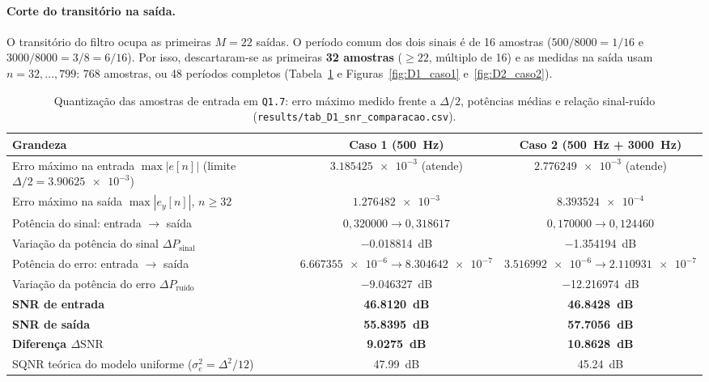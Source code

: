 \documentclass[11pt,a4paper]{article}
\begin{document}
\paragraph{Corte do transitório na saída.} O transitório do filtro ocupa as primeiras $M = 22$ saídas. O período comum dos dois sinais é de 16 amostras ($500/8000 = 1/16$ e $3000/8000 = 3/8 = 6/16$). Por isso, descartaram-se as primeiras \textbf{32 amostras} ($\ge 22$, múltiplo de 16) e as medidas na saída usam $n = 32, \dots, 799$: 768 amostras, ou 48 períodos completos (Tabela~\ref{tab:D1_snr} e Figuras~\ref{fig:D1_caso1} e~\ref{fig:D2_caso2}).

\begin{table}[!htbp]
    \centering
    \caption{Quantização das amostras de entrada em \texttt{Q1.7}: erro máximo medido frente a $\Delta/2$, potências médias e relação sinal-ruído (\texttt{results/\allowbreak tab\_D1\_\allowbreak snr\_comparacao.csv}).}
    \label{tab:D1_snr}
    \small
    \setlength{\tabcolsep}{4.5pt}
    \begin{adjustbox}{max width=\textwidth}
    \begin{tabular}{@{}lcc@{}}
        \toprule
        \textbf{Grandeza} & \textbf{Caso 1 (\SI{500}{Hz})} & \textbf{Caso 2 (\SI{500}{Hz} + \SI{3000}{Hz})} \\
        \midrule
        Erro máximo na entrada $\max|e[n]|$ (limite $\Delta/2 = \num{3,90625e-3}$) & $\num{3,185425e-3}$ (atende) & $\num{2,776249e-3}$ (atende) \\
        Erro máximo na saída $\max|e_y[n]|$, $n \ge 32$ & $\num{1,276482e-3}$ & $\num{8,393524e-4}$ \\
        \midrule
        Potência do sinal: entrada $\rightarrow$ saída & $0,320000 \rightarrow 0,318617$ & $0,170000 \rightarrow 0,124460$ \\
        Variação da potência do sinal $\Delta P_{\text{sinal}}$ & \SI{-0,018814}{dB} & \SI{-1,354194}{dB} \\
        Potência do erro: entrada $\rightarrow$ saída & $\num{6,667355e-6} \rightarrow \num{8,304642e-7}$ & $\num{3,516992e-6} \rightarrow \num{2,110931e-7}$ \\
        Variação da potência do erro $\Delta P_{\text{ruído}}$ & \SI{-9,046327}{dB} & \SI{-12,216974}{dB} \\
        \midrule
        \textbf{SNR de entrada} & \textbf{\SI{46,8120}{dB}} & \textbf{\SI{46,8428}{dB}} \\
        \textbf{SNR de saída} & \textbf{\SI{55,8395}{dB}} & \textbf{\SI{57,7056}{dB}} \\
        \textbf{Diferença $\Delta\text{SNR}$} & \textbf{\SI{+9,0275}{dB}} & \textbf{\SI{+10,8628}{dB}} \\
        \midrule
        SQNR teórica do modelo uniforme ($\sigma_e^2 = \Delta^2/12$) & \SI{47,99}{dB} & \SI{45,24}{dB} \\
        \bottomrule
    \end{tabular}
    \end{adjustbox}
\end{table}
\end{document}
